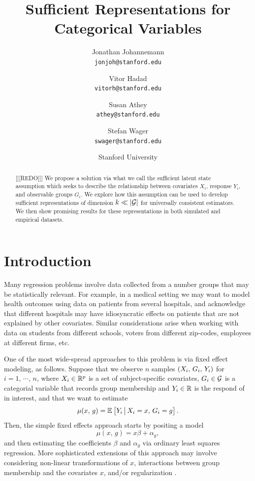 \documentclass{article}
\author{Jonathan Johannemann \\ \texttt{jonjoh@stanford.edu}
\and Vitor Hadad \\ \texttt{vitorh@stanford.edu}
\and Susan Athey \\ \texttt{athey@stanford.edu}
\and Stefan Wager \\ \texttt{swager@stanford.edu}}
\date{Stanford University}
\title{Sufficient Representations for Categorical Variables}
\theoremstyle{plain}
\theoremstyle{definition}
\theoremstyle{remark}
\begin{document}
\maketitle

\begin{abstract}
    [[[REDO]]]
    We propose a solution via what we call the sufficient latent state assumption which seeks to describe the relationship between covariates $X_i$, response $Y_i$, and observable groups $G_i$. We explore how this assumption can be used to develop sufficient representations of dimension $k \ll |\mathcal{G}|$ for universally consistent estimators. We then show promising results for these representations in both simulated and empirical datasets.
\end{abstract}




\section{Introduction}

Many regression problems involve data collected from a number groups that may be statistically relevant.
For example, in a medical setting we may want to model health outcomes using data on patients from
several hospitals, and acknowledge that different hospitals may have idiosyncratic effects on patients
that are not explained by other covariates. Similar considerations arise when working with data on
students from different schools, voters from different zip-codes, employees at different firms, etc.

One of the most wide-spread approaches to this problem is via fixed effect modeling,
as follows. Suppose that we observe $n$ samples $\left(X_i, \, G_i, \, Y_i\right)$
for $i = 1, \, \cdots, \, n$, where $X_i \in \mathbb{R}^p$ is a set of subject-specific covariates, $G_i \in \mathcal{G}$ is a categorial variable that
records group membership and $Y_i \in \mathbb{R}$ is the respond of in interest, and that we want to estimate
\begin{equation}
\label{eq:mu}
\mu(x, \, g) = \mathbb{E}_{}\left[Y_i \,\big|\, X_i = x, \, G_i = g\right].
\end{equation}
Then, the simple fixed effects approach starts by positing a model
\begin{equation}
\label{eq:FE}
\mu(x, \, g) = x \beta + \alpha_g,
\end{equation}
and then estimating the coefficients $\beta$ and $\alpha_g$ via ordinary least squares regression.
More sophisticated extensions of this approach may involve considering non-linear transformations
of $x$, interactions between group membership and the covariates $x$, and/or regularization
\citep{angrist2008mostly,diggle2002analysis,wooldridge2010econometric}.
\end{document}
